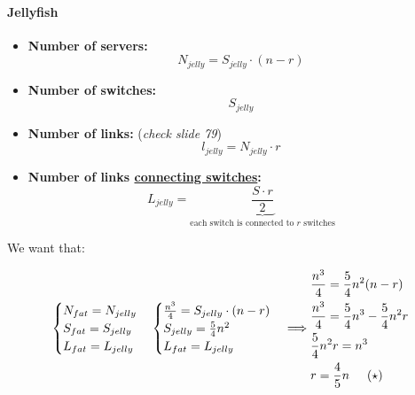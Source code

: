 \documentclass{article}
\begin{document}
\paragraph{Jellyfish}
\begin{itemize}
    \item \textbf{Number of servers:}
    \begin{equation}
        N_{jelly} = S_{jelly} \cdot (n-r)
    \end{equation}
    \item \textbf{Number of switches:} 
    \begin{equation}
        S_{jelly}
    \end{equation}
    \item \textbf{Number of links:} (\textit{check slide 79})
    \begin{equation}
        l_{jelly} = N_{jelly} \cdot r
    \end{equation}
    \item \textbf{Number of links \underline{connecting switches}:}
    \begin{equation}
        L_{jelly} = \underbrace{\frac{S \cdot r}{2}}_{\text{each switch is connected to $r$ switches}}
    \end{equation}
\end{itemize}

We want that:

\begin{equation}
    \begin{split}
        \begin{cases}
            N_{fat} = N_{jelly}\\
            S_{fat} = S_{jelly}\\
            L_{fat} = L_{jelly}
        \end{cases}
        \begin{cases}
            \frac{n^3}{4} = S_{jelly}\cdot (n-r)\\
            S_{jelly} = \frac{5}{4}n^2\\
            L_{fat} = L_{jelly}
        \end{cases} \Longrightarrow 
        \begin{split}
            &\frac{n^3}{4} = \frac{5}{4} n^2 (n-r)\\
            &\frac{n^3}{4} = \frac{5}{4} n^3 - \frac{5}{4} n^2 r\\
            &\frac{5}{4} n^2 r = n^3\\
            &r = \frac{4}{5} n \hspace{5mm} (\star)
        \end{split}
    \end{split}
\end{equation}
\end{document}
